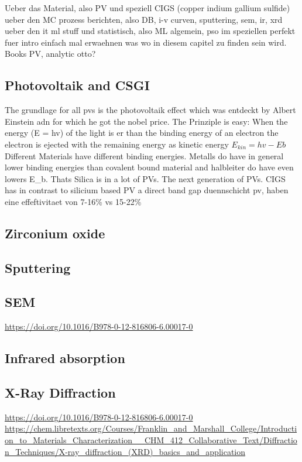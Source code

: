 Ueber das Material, also PV und speziell CIGS (copper indium gallium sulfide) 
ueber den MC prozess berichten, also DB, i-v curven, sputtering, sem, ir, xrd
ueber den it ml stuff und statistisch, also ML algemein, pso im speziellen 
perfekt fuer intro einfach mal erwaehnen was wo in diesem capitel zu finden sein wird. 
Books PV, analytic otto? 
\subsection{Photovoltaik and CSGI}
The grundlage for all pvs is the photovoltaik effect which was entdeckt by Albert Einstein adn for which he got the nobel price. 
The Prinziple is easy: When the energy (E = hv) of the light is er than the binding energy of an electron the electron is ejected with the remaining energy as kinetic energy 
\begin{math}
	E_{kin}=hv - Eb
\end{math}
Different Materials have different binding energies. Metalls do have in general lower binding energies than covalent bound material and halbleiter do have even lowers E_b. 
Thats Silica is in a lot of PVs. 
The next generation of PVs. 
CIGS has in contrast to silicium based PV a direct band gap
duennschicht pv, haben eine effeftivitaet von 7-16\% vs 15-22\% \cite{Mertens2018}
\subsection{Zirconium oxide}
\subsection{Sputtering}
\subsection{SEM}
\url{https://doi.org/10.1016/B978-0-12-816806-6.00017-0}\\
\subsection{Infrared absorption}
\subsection{X-Ray Diffraction}
\url{https://doi.org/10.1016/B978-0-12-816806-6.00017-0}\\
\url{https://chem.libretexts.org/Courses/Franklin_and_Marshall_College/Introduction_to_Materials_Characterization__CHM_412_Collaborative_Text/Diffraction_Techniques/X-ray_diffraction_(XRD)_basics_and_application}\\
